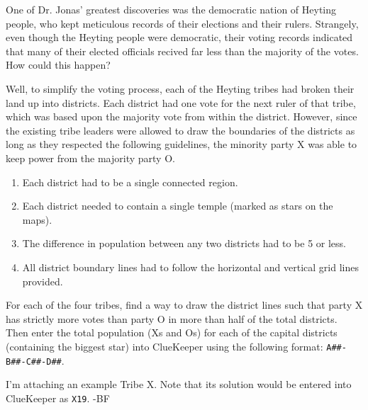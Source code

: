 One of Dr. Jonas' greatest discoveries was the democratic nation
of Heyting people, who kept meticulous records of their elections 
and their rulers.
Strangely, even though the Heyting people were democratic, 
their voting records indicated that many of their elected officials
recived far less than the majority of the votes.
How could this happen?

Well, to simplify the voting process, each of the Heyting tribes had broken their 
land up into districts.
Each district had one vote for the next ruler of that tribe, which was based upon
the majority vote from within the district.
However, since the existing tribe leaders were allowed to draw the boundaries 
of the districts as long as they respected the following guidelines,
the minority party X was able to keep power from the majority party O.
\begin{enumerate}
\item Each district had to be a single connected region.
\item Each district needed to contain a single temple (marked as stars on the maps).
\item The difference in population between any two districts had to be 5 or less.
\item All district boundary lines had to follow the horizontal and vertical grid lines provided.
\end{enumerate}

For each of the four tribes, find a way to draw the district lines such that party X
has strictly more votes than party O in more than half of the total districts.
Then enter the total population (Xs and Os) for each of the capital districts (containing
the biggest star) into
ClueKeeper using the following format: \texttt{A\#\#-B\#\#-C\#\#-D\#\#}.

I'm attaching an example Tribe X. Note that its solution would be entered into ClueKeeper as \texttt{X19}. -BF

